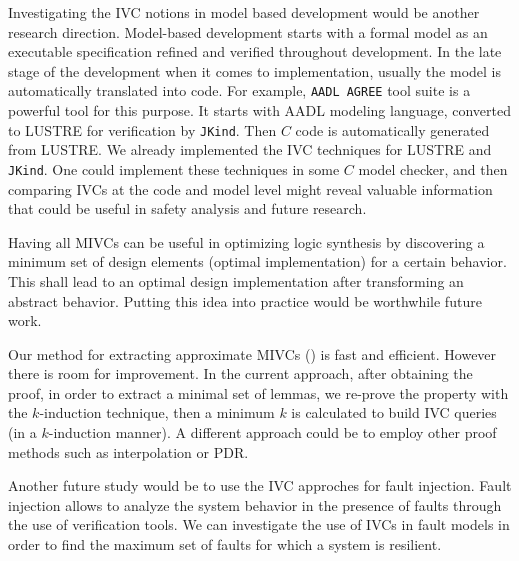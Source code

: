 Investigating the IVC notions in model based development would be another research direction. Model-based development starts with a formal model as an executable specification refined and verified throughout development. In the late stage of the development when it comes to implementation, usually the model is automatically translated into code. For example,  \texttt{AADL AGREE} tool suite is a powerful tool for this purpose. It starts with AADL modeling language, converted to LUSTRE for verification by \texttt{JKind}. Then $C$ code is automatically generated from LUSTRE. We already implemented the IVC techniques for LUSTRE and \texttt{JKind}. One could implement these techniques in some $C$ model checker, and then comparing IVCs at the code and model level might reveal valuable information that could be useful in safety analysis and future research.

Having all MIVCs can be useful in optimizing logic synthesis by discovering a minimum set of design elements (optimal implementation) for a certain behavior. This shall lead to an optimal design implementation after transforming an abstract behavior. Putting this idea into practice would be worthwhile future work.

Our method for extracting approximate MIVCs (\ucalg) is fast and efficient. However there is room for improvement. In the current approach, after obtaining the proof, in order to extract a minimal set of lemmas, we re-prove the property with the $k$-induction technique, then a minimum $k$ is calculated to build IVC queries (in a $k$-induction manner). A different approach could be to employ other proof methods such as interpolation or PDR.

Another future study would be to use the IVC approches for fault injection. Fault injection allows to analyze the system behavior in the presence of faults through the use of verification tools. We can investigate the use of IVCs in fault models in order to find the maximum set of faults for which a system is resilient.

